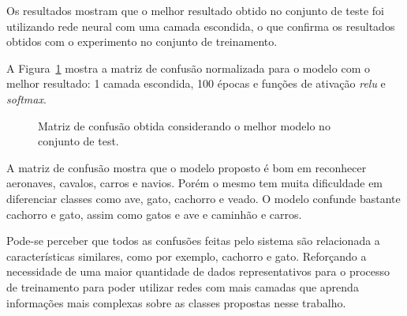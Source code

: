 \documentclass[conference]{IEEEtran}
\begin{document}
Os resultados mostram que o melhor resultado obtido no conjunto de teste foi utilizando rede neural com uma camada escondida, o que confirma os resultados obtidos com o experimento no conjunto de treinamento.

A Figura~\ref{fig:confusion} mostra a matriz de confusão normalizada para o modelo com o melhor resultado: 1 camada escondida, 100 épocas e funções de ativação \emph{relu} e \emph{softmax}.

\begin{figure}[!h]
	\centering
	{
		\setlength{\fboxsep}{1pt}
		\setlength{\fboxrule}{1pt}
	}
	\caption{\small Matriz de confusão obtida considerando o melhor modelo no conjunto de test.}
	\label{fig:confusion}
\end{figure}

A matriz de confusão mostra que o modelo proposto é bom em reconhecer aeronaves, cavalos, carros e navios. Porém o mesmo tem muita dificuldade em diferenciar classes como ave, gato, cachorro e veado. O modelo confunde bastante cachorro e gato, assim como gatos e ave e caminhão e carros.

Pode-se perceber que todos as confusões feitas pelo sistema são relacionada a características similares, como por exemplo, cachorro e gato. Reforçando a necessidade de uma maior quantidade de dados representativos para o processo de treinamento para poder utilizar redes com mais camadas que aprenda informações mais complexas sobre as classes propostas nesse trabalho.

\end{document}
